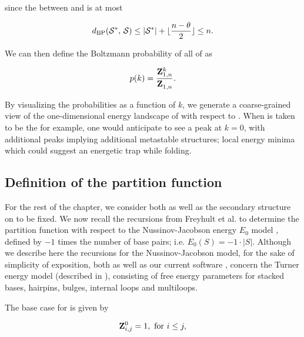 since the \bpd between \strSt and \str is at most

\begin{align}
\label{eq:fftbor:maxDist}
\dBP{\strSt}{\str} \leq |\strSt| + \lfloor \frac{n-\theta}{2} \rfloor \leq n.
\end{align}

We can then define the Boltzmann probability of all \kNbrs of \strSt as

\begin{align}
\label{eq:fftbor:probK}
p(k) =\frac{\bfZ{k}{1,n}}{\bfZ{}{1,n}}.
\end{align}

By visualizing the probabilities \pk as a function of $k$, we generate a
coarse-grained view of the one-dimensional energy landscape of \seq with
respect to \strSt. When \strSt is taken to be the \mfes for example, one would
anticipate to see a peak at $k=0$, with additional peaks implying additional
metastable structures; local energy minima which could suggest an energetic
trap while folding.

\subsection{Definition of the partition function
\texorpdfstring{}{}}
\label{subsec:fftbor:recursions}

For the rest of the chapter, we consider both \seq as well as the
secondary structure \strSt on \seq to be fixed. We now recall the
recursions from Freyhult et al. \citep{Freyhult.ab05} to determine
the partition function  with
respect to the Nussinov-Jacobson
energy $E_0$ model \citep{nussinovjacobson}, defined by
$-1$ times the number of base pairs; i.e. $E_0(S) = -1 \cdot |S|$.
Although we describe here the recursions for the Nussinov-Jacobson
model, for the sake of
simplicity of exposition, both \rnabor
\citep{Freyhult.ab05} as well as our current software \fftbor,
concern the Turner energy model (described in ), consisting of free energy parameters for
stacked bases, hairpins, bulges, internal loops and multiloops.


The base case for  is given by

\begin{align}
\label{eq:fftbor:initZpart1}
\bfZ{0}{i,j} = 1, \text{ for } i \le j,
\end{align}

